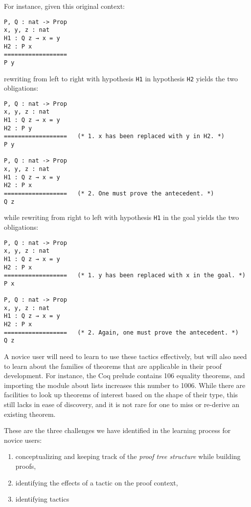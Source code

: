 For instance, given this original context:

\begin{verbatim}
P, Q : nat -> Prop
x, y, z : nat
H1 : Q z → x = y
H2 : P x
==================
P y
\end{verbatim}

rewriting from left to right with hypothesis \texttt{H1} in hypothesis
\texttt{H2} yields the two obligations:

\begin{verbatim}
P, Q : nat -> Prop
x, y, z : nat
H1 : Q z → x = y
H2 : P y
==================   (* 1. x has been replaced with y in H2. *)
P y

P, Q : nat -> Prop
x, y, z : nat
H1 : Q z → x = y
H2 : P x
==================   (* 2. One must prove the antecedent. *)
Q z
\end{verbatim}

while rewriting from right to left with hypothesis \texttt{H1} in the
goal yields the two obligations:

\begin{verbatim}
P, Q : nat -> Prop
x, y, z : nat
H1 : Q z → x = y
H2 : P x
==================   (* 1. y has been replaced with x in the goal. *)
P x

P, Q : nat -> Prop
x, y, z : nat
H1 : Q z → x = y
H2 : P x
==================   (* 2. Again, one must prove the antecedent. *)
Q z
\end{verbatim}

A novice user will need to learn to use these tactics effectively, but will also
need to learn about the families of theorems that are applicable in their proof
development.  For instance, the Coq prelude contains 106 equality theorems, and
importing the module about lists increases this number to 1006.  While there are
facilities to look up theorems of interest based on the shape of their type,
this still lacks in ease of discovery, and it is not rare for one to miss or
re-derive an existing theorem.


These are the three challenges we have identified in the learning process for
novice users:

\begin{enumerate}

  \item conceptualizing and keeping track of the \emph{proof tree structure}
while building proofs,

  \item identifying the effects of a tactic on the proof context,

  \item identifying tactics

\end{enumerate}
